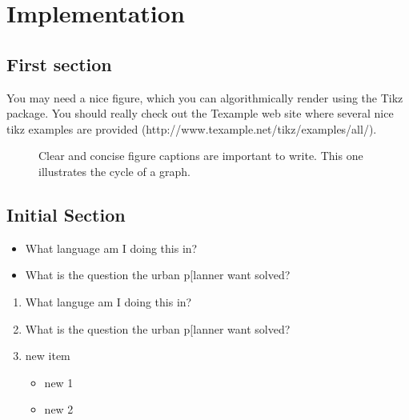 \chapter{Implementation}
\label{chap:impl}

\section{First section}

You may need a nice figure, which you can algorithmically render using the Tikz package. You should really check out the Texample web site where several nice tikz examples are provided (http://www.texample.net/tikz/examples/all/).

\begin{figure}
\centering
{}
\caption{Clear and concise figure captions are important to write. This one illustrates the cycle of a graph.}
\label{fig:tikzexample}
\end{figure}

\section{Initial Section}

\begin{itemize}
\item What language am I doing this in?
\item What is the question the urban p[lanner want solved?
\end{itemize}
 
\begin{enumerate}
\item What languge am I doing this in?
\item What is the question the urban p[lanner want solved?
\item new item
\begin{itemize}
\item new 1
\item new 2
\end{itemize}
\end{enumerate}

